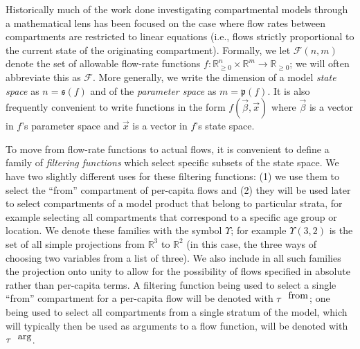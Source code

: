 \documentclass[pdflatex,sn-basic]{sn-jnl}%
\theoremstyle{definition}
\newcommand{\R}{\mathbb{R}}%
\newcommand{\Rnn}{\mathbb{R}_{\ge 0}}%
\newcommand{\pardim}[1]{\mathfrak{p}(#1)}%
\newcommand{\stadim}[1]{\mathfrak{s}(#1)}%
\newcommand{\fr}{\ensuremath{\mathcal F}}
\newcommand{\tauf}{\tau^{\mbox{\tiny from}}}
\newcommand{\taua}{\tau^{\mbox{\tiny arg}}}
\newcommand{\define}[1]{\emph{{#1}}}
\begin{document}
Historically much of the work done investigating compartmental models through a mathematical lens has been focused on the case where flow rates between compartments are restricted to linear equations (i.e., flows strictly proportional to the current state of the originating compartment).
Formally, we let $\fr(n, m)$ denote the set of allowable flow-rate functions $f:\Rnn^n\times\R^m\rightarrow \Rnn$; we will often abbreviate this as \fr. More generally, we write the dimension of a model \textit{state space} as $n=\stadim{f}$ and of the  \textit{parameter space} as $m=\pardim{f}$. It is also frequently convenient to write functions in the form $f(\vec{\beta}, \vec{x})$ where $\vec{\beta}$ is a vector in $f$'s parameter space and $\vec{x}$ is a vector in $f$'s state space. 

To move from flow-rate functions to actual flows, it is convenient to define a family of \define{filtering functions} which select specific subsets of the state space. We have two slightly different uses for these filtering functions: (1) we use them to select the ``from'' compartment of per-capita flows and (2) they will be used later to select compartments of a model product that belong to particular strata, for example selecting all compartments that correspond to a specific age group or location. We denote these families with the symbol $\Upsilon$; for example $\Upsilon(3,2)$ is the set of all simple projections from $\R^3$ to $\R^2$ (in this case, the three ways of choosing two variables from a list of three). We also include in all such families the projection onto unity to allow for the possibility of flows specified in absolute rather than per-capita terms. A filtering function being used to select a single ``from'' compartment for a per-capita flow will be denoted with $\tauf$; one being used to select all compartments from a single stratum of the model, which will typically then be used as arguments to a flow function, will be denoted with $\taua$.
\end{document}
